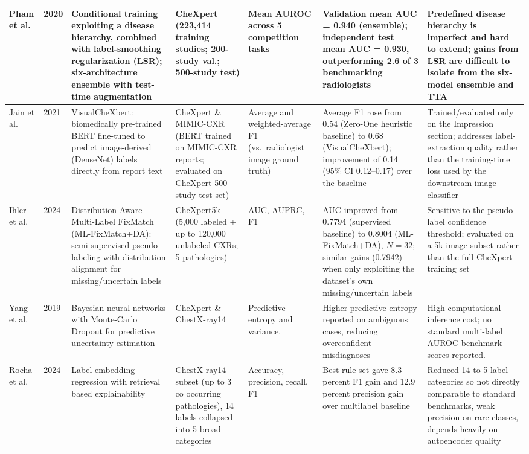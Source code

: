 \documentclass[conference]{IEEEtran}
\begin{document}
\begin{table}[!t]
\begin{tabular}{P{0.09}P{0.04}P{0.18}P{0.15}P{0.11}P{0.18}P{0.15}}
\midrule
Pham et al. \cite{ref5} & 2020 & Conditional training exploiting a disease hierarchy, combined with label-smoothing regularization (LSR); six-architecture ensemble with test-time augmentation & CheXpert (223,414 training studies; 200-study val.; 500-study test) & Mean AUROC across 5 competition tasks & Validation mean AUC = 0.940 (ensemble); independent test mean AUC = 0.930, outperforming 2.6 of 3 benchmarking radiologists & Predefined disease hierarchy is imperfect and hard to extend; gains from LSR are difficult to isolate from the six-model ensemble and TTA \\
\midrule
Jain et al. \cite{ref6} & 2021 & VisualCheXbert: biomedically pre-trained BERT fine-tuned to predict image-derived (DenseNet) labels directly from report text & CheXpert \& MIMIC-CXR (BERT trained on MIMIC-CXR reports; evaluated on CheXpert 500-study test set) & Average and weighted-average F1 (vs.\ radiologist image ground truth) & Average F1 rose from 0.54 (Zero-One heuristic baseline) to 0.68 (VisualCheXbert); improvement of 0.14 (95\% CI 0.12--0.17) over the baseline & Trained/evaluated only on the Impression section; addresses label-extraction quality rather than the training-time loss used by the downstream image classifier \\
\midrule
Ihler et al. \cite{ref7} & 2024 & Distribution-Aware Multi-Label FixMatch (ML-FixMatch+DA): semi-supervised pseudo-labeling with distribution alignment for missing/uncertain labels & CheXpert5k (5,000 labeled + up to 120,000 unlabeled CXRs; 5 pathologies) & AUC, AUPRC, F1 & AUC improved from 0.7794 (supervised baseline) to 0.8004 (ML-FixMatch+DA), $N = 32$; similar gains (0.7942) when only exploiting the dataset's own missing/uncertain labels & Sensitive to the pseudo-label confidence threshold; evaluated on a 5k-image subset rather than the full CheXpert training set \\
\midrule
Yang et al. \cite{ref8} & 2019 & Bayesian neural networks with Monte-Carlo Dropout for predictive uncertainty estimation & CheXpert \& ChestX-ray14 & Predictive entropy and variance. & Higher predictive entropy reported on ambiguous cases, reducing overconfident misdiagnoses & High computational inference cost; no standard multi-label AUROC benchmark scores reported. \\
\midrule
Rocha et al. \cite{ref9} & 2024 & Label embedding regression with retrieval based explainability & ChestX ray14 subset (up to 3 co occurring pathologies), 14 labels collapsed into 5 broad categories & Accuracy, precision, recall, F1 & Best rule set gave 8.3 percent F1 gain and 12.9 percent precision gain over multilabel baseline & Reduced 14 to 5 label categories so not directly comparable to standard benchmarks, weak precision on rare classes, depends heavily on autoencoder quality \\
\bottomrule
\end{tabular}
\end{table}
\end{document}
